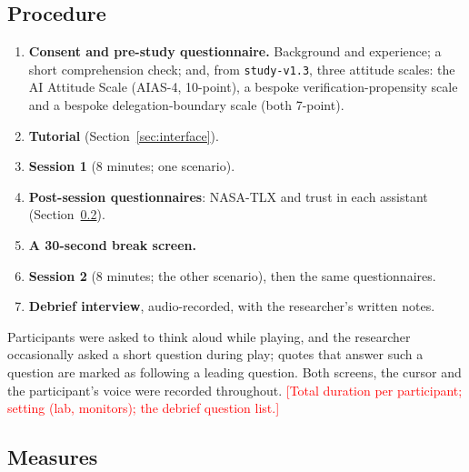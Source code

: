 \documentclass[10pt]{article}
\theoremstyle{definition}
\newcommand{\todo}[1]{\textcolor{red}{[#1]}}
\begin{document}
\subsection{Procedure}\label{sec:procedure}

\begin{enumerate}[noitemsep]
  \item \textbf{Consent and pre-study questionnaire.} Background and experience; a short comprehension check; and,
        from \texttt{study-v1.3}, three attitude scales: the AI Attitude Scale (AIAS-4, 10-point), a bespoke
        verification-propensity scale and a bespoke delegation-boundary scale (both 7-point).
  \item \textbf{Tutorial} (Section~\ref{sec:interface}).
  \item \textbf{Session 1} (8 minutes; one scenario).
  \item \textbf{Post-session questionnaires}: NASA-TLX and trust in each assistant (Section~\ref{sec:measures}).
  \item \textbf{A 30-second break screen.}
  \item \textbf{Session 2} (8 minutes; the other scenario), then the same questionnaires.
  \item \textbf{Debrief interview}, audio-recorded, with the researcher's written notes.
\end{enumerate}
Participants were asked to think aloud while playing, and the researcher occasionally asked a short question during
play; quotes that answer such a question are marked as following a leading question. Both screens, the cursor and
the participant's voice were recorded throughout. \todo{Total duration per participant; setting (lab, monitors);
the debrief question list.}

\subsection{Measures}\label{sec:measures}
\end{document}
